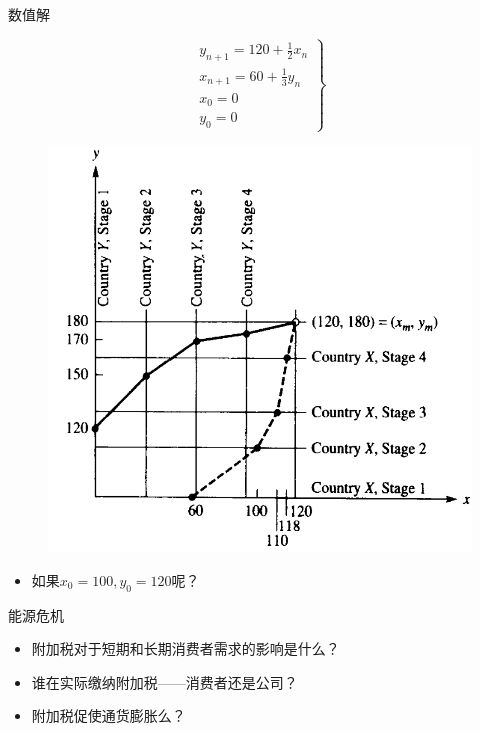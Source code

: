 \documentclass[mathserif, table]{beamer}
\begin{document}
\begin{frame}{数值解}
  \begin{figure}
    \begin{minipage}{.5\linewidth}
      \[
      \left.
        \begin{array}{l}
          y_{n+1}=120 + \frac{1}{2}x_n\\
          x_{n+1}=60 + \frac{1}{3}y_n\\
          x_0 = 0\\
          y_0 = 0
        \end{array}
      \right\}
      \]
    \end{minipage}%
    \begin{minipage}{.5\linewidth}
      \includegraphics[width=\textwidth]{arc.png}
    \end{minipage}
  \end{figure}

  \begin{itemize}
  \item 如果$x_0=100, y_0=120$呢？
  \end{itemize}

\end{frame}

\begin{frame}{能源危机}
  \begin{itemize}
  \item 附加税对于短期和长期消费者需求的影响是什么？
  \item 谁在实际缴纳附加税——消费者还是公司？
  \item 附加税促使通货膨胀么？
  \end{itemize}
\end{frame}
\end{document}
